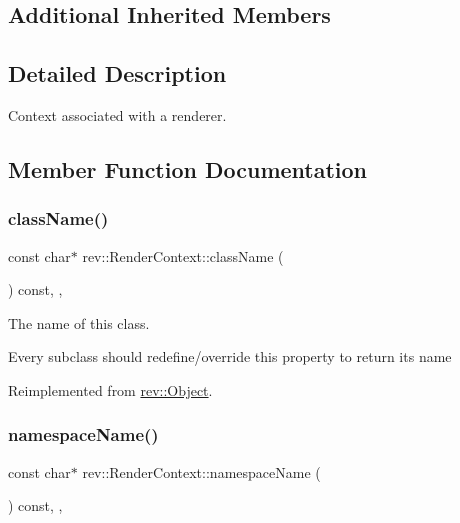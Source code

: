 \subsection*{Additional Inherited Members}


\subsection{Detailed Description}
Context associated with a renderer. 

\subsection{Member Function Documentation}
\mbox{\label{classrev_1_1_render_context_aabbf2a2fa99c196ee07208eb52b7f208}} 
\subsubsection{\texorpdfstring{className()}{className()}}
{\footnotesize\ttfamily const char$\ast$ rev\+::\+Render\+Context\+::class\+Name (\begin{DoxyParamCaption}{ }\end{DoxyParamCaption}) const\hspace{0.3cm}{\ttfamily [inline]}, {\ttfamily [override]}, {\ttfamily [virtual]}}



The name of this class. 

Every subclass should redefine/override this property to return its name 

Reimplemented from \mbox{\hyperlink{classrev_1_1_object_a7a2013f91169479b65cf93afdc5d9a68}{rev\+::\+Object}}.

\mbox{\label{classrev_1_1_render_context_a07d4f4c563a4bc001f83a6f657221c9d}} 
\subsubsection{\texorpdfstring{namespaceName()}{namespaceName()}}
{\footnotesize\ttfamily const char$\ast$ rev\+::\+Render\+Context\+::namespace\+Name (\begin{DoxyParamCaption}{ }\end{DoxyParamCaption}) const\hspace{0.3cm}{\ttfamily [inline]}, {\ttfamily [override]}, {\ttfamily [virtual]}}



